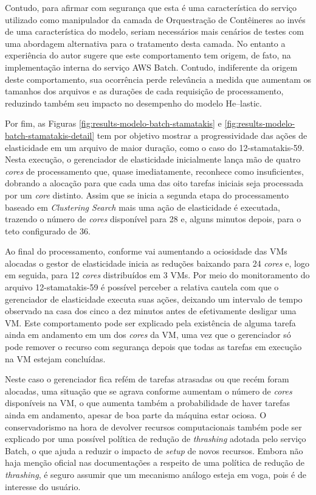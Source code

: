 \documentclass[english,brazilian]{UNISINOSmonografia} %
\begin{document}
Contudo, para afirmar com segurança que esta é uma característica do serviço utilizado como manipulador da camada de Orquestração de Contêineres ao invés de uma característica do modelo, seriam necessários mais cenários de testes com uma abordagem alternativa para o tratamento desta camada.
%
No entanto a experiência do autor sugere que este comportamento tem origem, de fato, na implementação interna do serviço AWS Batch.
%
Contudo, indiferente da origem deste comportamento, sua ocorrência perde relevância a medida que aumentam os tamanhos dos arquivos e as durações de cada requisição de processamento, reduzindo também seu impacto no desempenho do modelo \textsf{He}--lastic.


Por fim, as Figuras \ref{fig:results-modelo-batch-stamatakis} e
\ref{fig:results-modelo-batch-stamatakis-detail} tem por objetivo mostrar a progressividade das ações de elasticidade em um arquivo de maior duração, como o caso do 12-stamatakis-59.
%
Nesta execução, o gerenciador de elasticidade inicialmente lança mão de quatro \textit{cores} de processamento que, quase imediatamente, reconhece como insuficientes, dobrando a alocação para que cada uma das oito tarefas iniciais seja processada por um \textit{core} distinto.
%
Assim que se inicia a segunda etapa do processamento baseado em \textit{Clustering Search} mais uma ação de elasticidade é executada, trazendo o número de \textit{cores} disponível para 28 e, alguns minutos depois, para o teto configurado de 36.



Ao final do processamento, conforme vai aumentando a ociosidade das VMs alocadas o gestor de elasticidade inicia as reduções baixando para 24 \textit{cores} e, logo em seguida, para 12 \textit{cores} distribuídos em 3 VMs.
%
Por meio do monitoramento do arquivo 12-stamatakis-59 é possível perceber a relativa cautela com que o gerenciador de elasticidade executa suas ações, deixando um intervalo de tempo observado na casa dos cinco a dez minutos antes de efetivamente desligar uma VM.
%
Este comportamento pode ser explicado pela existência de alguma tarefa ainda em andamento em um dos \textit{cores} da VM, uma vez que o gerenciador só pode remover o recurso com segurança depois que todas as tarefas em execução na VM estejam concluídas.


Neste caso o gerenciador fica refém de tarefas atrasadas ou que recém foram alocadas, uma situação que se agrava conforme aumentam o número de \textit{cores} disponíveis na VM, o que aumenta também a probabilidade de haver tarefas ainda em andamento, apesar de boa parte da máquina estar ociosa.
%
O conservadorismo na hora de devolver recursos computacionais também pode ser explicado por uma possível política de redução de \textit{thrashing} adotada pelo serviço Batch, o que ajuda a reduzir o impacto de \textit{setup} de novos recursos.
%
Embora não haja menção oficial nas documentações a respeito de uma política de redução de \textit{thrashing}, é seguro assumir que um mecanismo análogo esteja em voga, pois é de interesse do usuário.
\end{document}
